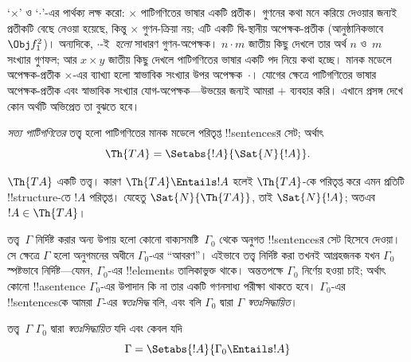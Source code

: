 \documentclass[../../../include/open-logic-section]{subfiles}
\begin{document}
`$\times$' ও `$\cdot$'-এর পার্থক্য লক্ষ করো: $\times$ পাটিগণিতের ভাষার একটি
প্রতীক। গুণনের কথা মনে করিয়ে দেওয়ার জন্যই প্রতীকটি বেছে নেওয়া হয়েছে, কিন্তু
$\times$ গুণন-ক্রিয়া নয়; এটি একটি দ্বি-স্থানীয় অপেক্ষক-প্রতীক (আনুষ্ঠানিকভাবে
$\Obj f^2_1$)। অন্যদিকে, $\cdot$-ই~\emph{হলো} সাধারণ গুণন-অপেক্ষক। $n \cdot m$
জাতীয় কিছু দেখলে তার অর্থ $n$ ও~$m$ সংখ্যার গুণফল; আর $x \times y$ জাতীয়
কিছু দেখলে পাটিগণিতের ভাষার একটি পদ নিয়ে কথা হচ্ছে। মানক মডেলে অপেক্ষক-প্রতীক
$\times$-এর ব্যাখ্যা হলো স্বাভাবিক সংখ্যার উপর অপেক্ষক~$\cdot$। যোগের ক্ষেত্রে
পাটিগণিতের ভাষার অপেক্ষক-প্রতীক এবং স্বাভাবিক সংখ্যার যোগ-অপেক্ষক—উভয়ের জন্যই
আমরা $+$ ব্যবহার করি। এখানে প্রসঙ্গ দেখে কোন অর্থটি অভিপ্রেত তা বুঝতে হবে।

\begin{defn}
\emph{সত্য পাটিগণিতের} তত্ত্ব হলো পাটিগণিতের মানক মডেলে পরিতৃপ্ত
!!{sentence}sর সেট; অর্থাৎ
\[
\Th{TA} = \Setabs{!A}{\Sat{N}{!A}}.
\]
\end{defn}

$\Th{TA}$ একটি তত্ত্ব। কারণ $\Th{TA} \Entails !A$ হলেই $\Th{TA}$-কে
পরিতৃপ্ত করে এমন প্রতিটি !!{structure}-তে $!A$ পরিতৃপ্ত। যেহেতু
$\Sat{N}{\Th{TA}}$, তাই $\Sat{N}{!A}$; অতএব $!A \in \Th{TA}$।

তত্ত্ব~$\Gamma$ নির্দিষ্ট করার অন্য উপায় হলো কোনো বাক্যসমষ্টি~$\Gamma_0$ থেকে
অনুগত !!{sentence}sর সেট হিসেবে দেওয়া। সে ক্ষেত্রে $\Gamma$ হলো অনুগমনের
অধীনে $\Gamma_0$-এর ``আবরণ''। এইভাবে তত্ত্ব নির্দিষ্ট করা তখনই আগ্রহজনক যখন
$\Gamma_0$ স্পষ্টভাবে নির্দিষ্ট—যেমন, $\Gamma_0$-এর !!{element}s তালিকাভুক্ত
থাকে। অন্ততপক্ষে $\Gamma_0$ নির্ণেয় হওয়া চাই; অর্থাৎ কোনো !!a{sentence}
$\Gamma_0$-এর উপাদান কি না তার একটি গণনসাধ্য পরীক্ষা থাকতে হবে। $\Gamma_0$-এর
!!{sentence}sকে আমরা $\Gamma$-এর \emph{স্বতঃসিদ্ধ} বলি, এবং বলি
$\Gamma_0$ দ্বারা $\Gamma$ \emph{স্বতঃসিদ্ধায়িত}।

\begin{defn}
তত্ত্ব~$\Gamma$ $\Gamma_0$ দ্বারা \emph{স্বতঃসিদ্ধায়িত} যদি এবং কেবল যদি
\[
\Gamma = \Setabs{!A}{\Gamma_0 \Entails !A}
\]
\end{defn}
\end{document}
